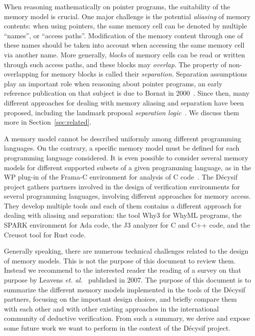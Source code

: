 \documentclass[a4paper,11pt]{article}
\begin{document}
When reasoning mathematically on pointer programs, the suitability of the memory
model is crucial. One major challenge is the potential \emph{aliasing} of memory
contents: when using pointers, the same memory cell can be denoted by multiple
``names'', or ``access paths''. Modification of the memory content through one
of these names should be taken into account when accessing the same memory cell
via another name. More generally, \emph{blocks} of memory cells can be read or
written through such access paths, and these blocks may \emph{overlap}. The
property of non-overlapping for memory blocks is called their
\emph{separation}. Separation assumptions play an important role when reasoning
about pointer programs, an early reference publication on that subject is due to
Bornat in 2000~\cite{bornat00mpc}.  Since then, many different approaches for
dealing with memory aliasing and separation have been proposed, including the
landmark proposal \emph{separation logic}~\cite{reynolds02lics}. We discuss them
more in Section~\ref{sec:related}.

A memory model cannot be described uniformly among different programming
languages. On the contrary, a specific memory model must be defined for each
programming language considered. It is even possible to consider several memory
models for different supported subsets of a given programming language, as in
the WP plug-in of the Frama-C environment for analysis of C
code~\cite{blanchard2024wp}.
%
The Décysif project gathers partners involved in the design of
verification environments for several programming languages, involving
different approaches for memory access. They develop multiple tools and each of them
contains a different approach for dealing with aliasing and separation: the tool
Why3 for WhyML programs, the SPARK environment for Ada code, the J3
analyzer for C and C++ code, and the Creusot tool for Rust code.

Generally speaking, there are numerous technical challenges related to the
design of memory models. This is not the purpose of this document to review
them. Instead we recommend to the interested reader the reading of a survey on
that purpose by Leavens \emph{et. al.}~\cite{leavens07} published in 2007.  The
purpose of this document is to summarize the different memory models
implemented in the tools of the Décysif partners, focusing on the important design
choices, and briefly compare them with each other and with other existing
approaches in the international community of deductive verification. From such a
summary, we derive and expose some future work we want to perform in the context
of the Décysif project.
\end{document}
